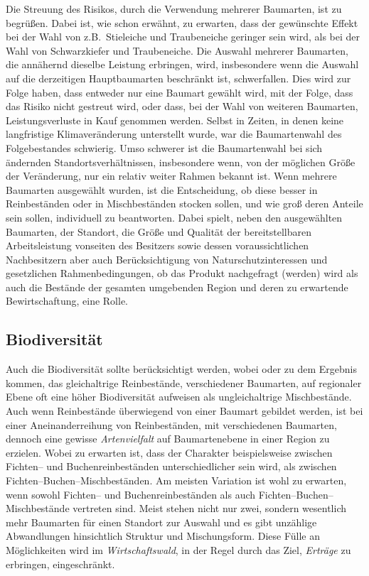 \documentclass[twocolumn]{scrartcl}
\begin{document}
Die Streuung des Risikos, durch die Verwendung mehrerer Baumarten, ist zu
begrüßen. Dabei ist, wie schon erwähnt, zu erwarten, dass der gewünschte Effekt
bei der Wahl von z.B.\ Stieleiche und Traubeneiche geringer sein wird, als bei
der Wahl von Schwarzkiefer und Traubeneiche. Die Auswahl mehrerer Baumarten, die
annähernd dieselbe Leistung erbringen, wird, insbesondere wenn die Auswahl auf
die derzeitigen Hauptbaumarten beschränkt ist, schwerfallen. Dies wird zur Folge
haben, dass entweder nur eine Baumart gewählt wird, mit der Folge, dass das
Risiko nicht gestreut wird, oder dass, bei der Wahl von weiteren Baumarten,
Leistungsverluste in Kauf genommen werden. Selbst in Zeiten, in denen keine
langfristige Klimaveränderung unterstellt wurde, war die Baumartenwahl des
Folgebestandes schwierig. Umso schwerer ist die Baumartenwahl bei sich ändernden
Standortsverhältnissen, insbesondere wenn, von der möglichen Größe der
Veränderung, nur ein relativ weiter Rahmen bekannt ist. Wenn mehrere Baumarten
ausgewählt wurden, ist die Entscheidung, ob diese besser in Reinbeständen oder
in Mischbeständen stocken sollen, und wie groß deren Anteile sein sollen,
individuell zu beantworten. Dabei spielt, neben den ausgewählten Baumarten, der
Standort, die Größe und Qualität der bereitstellbaren Arbeitsleistung vonseiten
des Besitzers sowie dessen voraussichtlichen Nachbesitzern aber auch
Berücksichtigung von Naturschutzinteressen und gesetzlichen Rahmenbedingungen,
ob das Produkt nachgefragt (werden) wird als auch die Bestände der gesamten
umgebenden Region und deren zu erwartende Bewirtschaftung, eine Rolle.

\subsection{Biodiversität}
\label{ssec:biodiversitaet}

Auch die Biodiversität sollte berücksichtigt werden, wobei
\cite{heinrichs2019Reinbestand} oder \cite{schall2017Reinbestand} zu dem
Ergebnis kommen, das gleichaltrige Reinbestände, verschiedener Baumarten, auf
regionaler Ebene oft eine höher Biodiversität aufweisen als ungleichaltrige
Mischbestände. Auch wenn Reinbestände überwiegend von einer Baumart gebildet
werden, ist bei einer Aneinanderreihung von Reinbeständen, mit verschiedenen
Baumarten, dennoch eine gewisse \emph{Artenvielfalt} auf Baumartenebene in einer
Region zu erzielen. Wobei zu erwarten ist, dass der Charakter beispielsweise
zwischen Fichten-- und Buchenreinbeständen unterschiedlicher sein wird, als
zwischen Fichten--Buchen--Mischbeständen. Am meisten Variation ist wohl zu
erwarten, wenn sowohl Fichten-- und Buchenreinbeständen als auch
Fichten--Buchen--Mischbestände vertreten sind. Meist stehen nicht nur zwei,
sondern wesentlich mehr Baumarten für einen Standort zur Auswahl und es gibt
unzählige Abwandlungen hinsichtlich Struktur und Mischungsform. Diese Fülle an
Möglichkeiten wird im \emph{Wirtschaftswald}, in der Regel durch das Ziel,
\emph{Erträge} zu erbringen, eingeschränkt.
\end{document}
